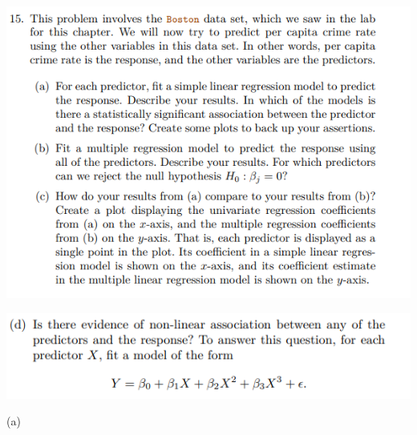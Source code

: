 \documentclass[
]{article}
\begin{document}
\includegraphics{images/clipboard-3010492794.png}

\includegraphics{images/clipboard-3808075512.png}

(a)
\end{document}

